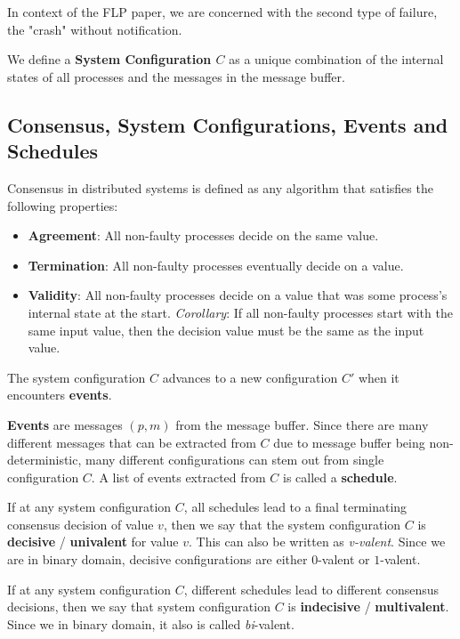 In context of the FLP paper, we are concerned with the second type of failure, the "crash" without notification.

We define a \textbf{System Configuration $C$} as a unique combination of the internal states of all processes and the messages in the message buffer.

\subsection{Consensus, System Configurations, Events and Schedules}
Consensus in distributed systems is defined as any algorithm that satisfies the following properties:
\begin{itemize}
    \item \textbf{Agreement}: All non-faulty processes decide on the same value.
    \item \textbf{Termination}: All non-faulty processes eventually decide on a value.
    \item \textbf{Validity}: All non-faulty processes decide on a value that was some process's internal state at the start. \emph{Corollary}: If all non-faulty processes start with the same input value, then the decision value must be the same as the input value.
\end{itemize}

The system configuration $C$ advances to a new configuration $C'$ when it encounters \textbf{events}. 

\textbf{Events} are messages $(p, m)$ from the message buffer. Since there are many different messages that can be extracted from $C$ due to message buffer being non-deterministic, many different configurations can stem out from single configuration $C$. A list of events extracted from $C$ is called a \textbf{schedule}.

If at any system configuration $C$, all schedules lead to a final terminating consensus decision of value $v$, then we say that the system configuration $C$ is \textbf{decisive} / \textbf{univalent} for value $v$. This can also be written as \emph{v-valent}. Since we are in binary domain, decisive configurations are either $0$-valent or $1$-valent.

If at any system configuration $C$, different schedules lead to different consensus decisions, then we say that system configuration $C$ is \textbf{indecisive} / \textbf{multivalent}. Since we in binary domain, it also is called \emph{bi}-valent.


